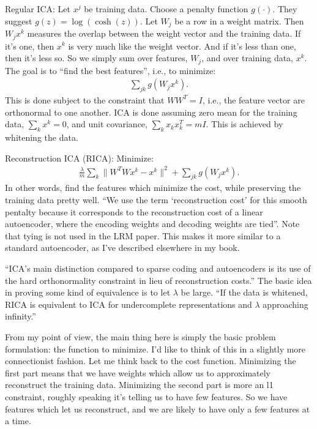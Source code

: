 \documentclass[12pt]{report}
\begin{document}
Regular ICA: Let $x^j$ be training data.  Choose a penalty function
$g(\cdot)$.  They suggest $g(z) = \log(\cosh(z))$.  Let $W_j$ be a row
in a weight matrix.  Then $W_j x^k$ measures the overlap between the
weight vector and the training data.  If it's one, then $x^k$ is very
much like the weight vector.  And if it's less than one, then it's
less so.  So we simply sum over features, $W_j$, and over training
data, $x^k$.  The goal is to ``find the best features'', i.e., to
minimize:
\begin{eqnarray}
  \sum_{jk} g(W_j x^k).
\end{eqnarray}
This is done subject to the constraint that $WW^T = I$, i.e., the
feature vector are orthonormal to one another.  ICA is done assuming
zero mean for the training data, $\sum_k x^k = 0$, and unit
covariance, $\sum_k x_k x_k^T = m I$.  This is achieved by whitening
the data.

Reconstruction ICA (RICA): Minimize:
\begin{eqnarray}
  \frac{\lambda}{m} \sum_k \| W^T W x^k - x^k\|^2 + \sum_{jk} g(W_j x^k).
\end{eqnarray}
In other words, find the features which minimize the cost, while
preserving the training data pretty well.  ``We use the term
`reconstruction cost' for this smooth pentalty because it corresponds
to the reconstruction cost of a linear autoencoder, where the encoding
weights and decoding weights are tied''.  Note that tying is not used
in the LRM paper.  This makes it more similar to a standard
autoencoder, as I've described elsewhere in my book.

``ICA's main distinction compared to sparse coding and autoencoders is
its use of the hard orthonormality constraint in lieu of
reconstruction costs.''  The basic idea in proving some kind of
equivalence is to let $\lambda$ be large.  ``If the data is whitened,
RICA is equivalent to ICA for undercomplete representations and
$\lambda$ approaching infinity.''

From my point of view, the main thing here is simply the basic problem
formulation: the function to minimize.  I'd like to think of this in a
slightly more connectionist fashion.  Let me think back to the cost
function.  Minimizing the first part means that we have weights which
allow us to approximately reconstruct the training data.  Minimizing
the second part is more an l1 constraint, roughly speaking it's
telling us to have few features.  So we have features which let us
reconstruct, and we are likely to have only a few features at a time.
\end{document}
